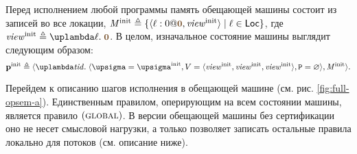Перед исполнением любой программы память обещающей машины состоит из записей во все локации,
$\Mprom^{\rm init} \triangleq \{ \writeEvt{\loc}{0}{\tstamp{0}}{\R^{\rm init}} \mid \loc \in \Loc \}$,
где $\R^{\rm init} \triangleq \lambda \loc. \; \tstamp{0}$. В целом, изначальное состояние машины выглядит следующим образом:
\[
  \pinit \triangleq \angled{
     \lambda \tId. \; \angled{\pstate = \pstate^{\rm init},
                              \V = \angled{\R^{\rm init}, \R^{\rm init}, \R^{\rm init}}, \PromSet = \emptyset},
     \Mprom^{\rm init}}.
\]

Перейдем к описанию шагов исполнения в обещающей машине (см. рис. \ref{fig:full-opsem-a}).
Единственным правилом, оперирующим на всем состоянии машины, является правило $(\textsc{global})$.
В версии обещающей машины без сертификации \cite{Kang-al:POPL17} оно не несет смысловой нагрузки,
а только позволяет записать остальные правила локально для потоков (см. описание ниже).

